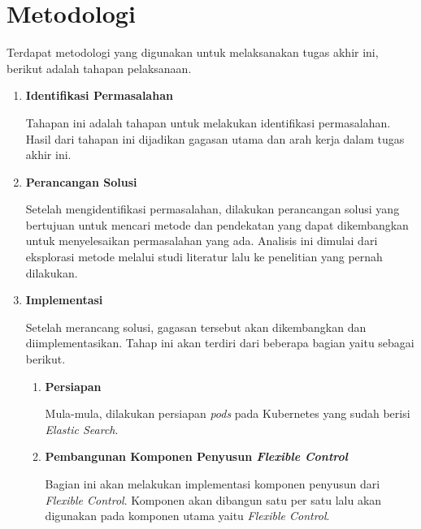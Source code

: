 \section{Metodologi}

Terdapat metodologi yang digunakan untuk melaksanakan tugas akhir ini, berikut adalah tahapan pelaksanaan.
\begin{enumerate}
    \item \textbf{Identifikasi Permasalahan}
    
    Tahapan ini adalah tahapan untuk melakukan identifikasi permasalahan. Hasil dari tahapan ini dijadikan gagasan utama dan arah kerja dalam tugas akhir ini.

    \item \textbf{Perancangan Solusi}
    
    Setelah mengidentifikasi permasalahan, dilakukan perancangan solusi yang bertujuan untuk mencari metode dan pendekatan yang dapat dikembangkan untuk menyelesaikan permasalahan yang ada. Analisis ini dimulai dari eksplorasi metode melalui studi literatur lalu ke penelitian yang pernah dilakukan.

    \item \textbf{Implementasi}
    
    Setelah merancang solusi, gagasan tersebut akan dikembangkan dan diimplementasikan. Tahap ini akan terdiri dari beberapa bagian yaitu sebagai berikut.
    \begin{enumerate}
        \item \textbf{Persiapan}
    
        Mula-mula, dilakukan persiapan \textit{pods} pada Kubernetes yang sudah berisi \textit{Elastic Search}.

        \item \textbf{Pembangunan Komponen Penyusun \textit{Flexible Control}}
        
        Bagian ini akan melakukan implementasi komponen penyusun dari \textit{Flexible Control}. Komponen akan dibangun satu per satu lalu akan digunakan pada komponen utama yaitu \textit{Flexible Control}.

        

        

\end{enumerate}
\end{enumerate}

